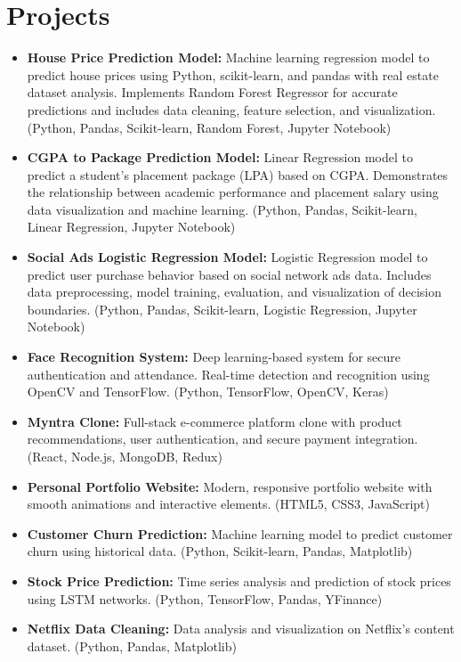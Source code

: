 \documentclass[11pt,a4paper]{article}
\begin{document}
\section*{Projects}
\begin{itemize}[leftmargin=*]
    \item \textbf{House Price Prediction Model:} Machine learning regression model to predict house prices using Python, scikit-learn, and pandas with real estate dataset analysis. Implements Random Forest Regressor for accurate predictions and includes data cleaning, feature selection, and visualization. (Python, Pandas, Scikit-learn, Random Forest, Jupyter Notebook)
    \item \textbf{CGPA to Package Prediction Model:} Linear Regression model to predict a student's placement package (LPA) based on CGPA. Demonstrates the relationship between academic performance and placement salary using data visualization and machine learning. (Python, Pandas, Scikit-learn, Linear Regression, Jupyter Notebook)
    \item \textbf{Social Ads Logistic Regression Model:} Logistic Regression model to predict user purchase behavior based on social network ads data. Includes data preprocessing, model training, evaluation, and visualization of decision boundaries. (Python, Pandas, Scikit-learn, Logistic Regression, Jupyter Notebook)
    \item \textbf{Face Recognition System:} Deep learning-based system for secure authentication and attendance. Real-time detection and recognition using OpenCV and TensorFlow. (Python, TensorFlow, OpenCV, Keras)
    \item \textbf{Myntra Clone:} Full-stack e-commerce platform clone with product recommendations, user authentication, and secure payment integration. (React, Node.js, MongoDB, Redux)
    \item \textbf{Personal Portfolio Website:} Modern, responsive portfolio website with smooth animations and interactive elements. (HTML5, CSS3, JavaScript)
    \item \textbf{Customer Churn Prediction:} Machine learning model to predict customer churn using historical data. (Python, Scikit-learn, Pandas, Matplotlib)
    \item \textbf{Stock Price Prediction:} Time series analysis and prediction of stock prices using LSTM networks. (Python, TensorFlow, Pandas, YFinance)
    \item \textbf{Netflix Data Cleaning:} Data analysis and visualization on Netflix's content dataset. (Python, Pandas, Matplotlib)

\end{itemize}
\end{document}
